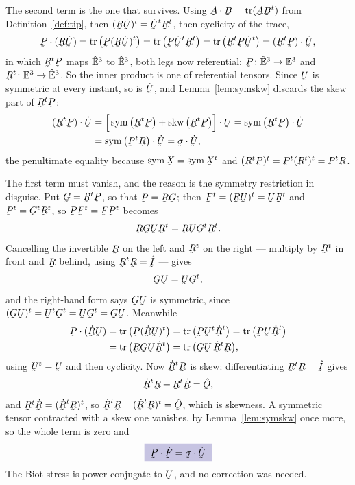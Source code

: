 \begin{solution}
The second term is the one that survives. Using
$\bA\cdot\bB=\tr(\bA\bB^{t})$ from Definition~\ref{def:tip}, then
$(\bR\dot\bU)^{t}=\dot\bU^{t}\bR^{t}$, then cyclicity of the trace,
\[
   \bP\cdot(\bR\dot\bU)=\tr\big(\bP(\bR\dot\bU)^{t}\big)
   =\tr\big(\bP\dot\bU^{t}\bR^{t}\big)
   =\tr\big(\bR^{t}\bP\dot\bU^{t}\big)
   =(\bR^{t}\bP)\cdot\dot\bU ,
\]
in which $\bR^{t}\bP$ maps $\hat{\mathbb{E}}^{3}$ to $\hat{\mathbb{E}}^{3}$, both legs now referential:
$\bP\colon\hVt\to\Vt$ and $\bR^{t}\colon\Vt\to\hVt$. So the inner
product is one of referential tensors. Since $\bU$ is symmetric at
every instant, so is $\dot\bU$, and Lemma~\ref{lem:symskw} discards the
skew part of $\bR^{t}\bP$:
\[
\begin{aligned}
   (\bR^{t}\bP)\cdot\dot\bU
   &=\Big[\Sym\big(\bR^{t}\bP\big)+\Skw\big(\bR^{t}\bP\big)\Big]
     \cdot\dot\bU
    =\Sym\big(\bR^{t}\bP\big)\cdot\dot\bU\\
   &=\Sym\big(\bP^{t}\bR\big)\cdot\dot\bU
    =\vek\sigma\cdot\dot\bU ,
\end{aligned}
\]
the penultimate equality because $\Sym\bX=\Sym\bX^{t}$ and
$(\bR^{t}\bP)^{t}=\bP^{t}(\bR^{t})^{t}=\bP^{t}\bR$.

The first term must vanish, and the reason is the symmetry restriction
 in disguise. Put $\bG=\bR^{t}\bP$, so that $\bP=\bR\bG$;
then $\bF^{t}=(\bR\bU)^{t}=\bU\bR^{t}$ and $\bP^{t}=\bG^{t}\bR^{t}$,
so $\bP\bF^{t}=\bF\bP^{t}$ becomes
\[
   \bR\bG\bU\bR^{t}=\bR\bU\bG^{t}\bR^{t} .
\]
Cancelling the invertible $\bR$ on the left and $\bR^{t}$ on the right
--- multiply by $\bR^{t}$ in front and $\bR$ behind, using
$\bR^{t}\bR=\hI$ --- gives
\[
   \bG\bU=\bU\bG^{t} ,
\]
and the right-hand form says $\bG\bU$ is symmetric, since
$(\bG\bU)^{t}=\bU^{t}\bG^{t}=\bU\bG^{t}=\bG\bU$. Meanwhile
\[
\begin{aligned}
   \bP\cdot(\dot\bR\bU)
   &=\tr\big(\bP(\dot\bR\bU)^{t}\big)
    =\tr\big(\bP\bU^{t}\dot\bR^{t}\big)
    =\tr\big(\bP\bU\dot\bR^{t}\big)\\
   &=\tr\big(\bR\bG\bU\dot\bR^{t}\big)
    =\tr\big(\bG\bU\,\dot\bR^{t}\bR\big),
\end{aligned}
\]
using $\bU^{t}=\bU$ and then cyclicity. Now $\dot\bR^{t}\bR$ is skew:
differentiating $\bR^{t}\bR=\hI$ gives
\[
   \dot\bR^{t}\bR+\bR^{t}\dot\bR=\hOb ,
\]
and $\bR^{t}\dot\bR=(\dot\bR^{t}\bR)^{t}$, so
$\dot\bR^{t}\bR+(\dot\bR^{t}\bR)^{t}=\hOb$, which is skewness. A
symmetric tensor contracted with a skew one vanishes, by
Lemma~\ref{lem:symskw} once more, so the whole term is zero and
\[
   \boxed{\;\bP\cdot\dot\bF=\vek\sigma\cdot\dot\bU\;}
\]
The Biot stress is power conjugate to $\bU$, and no correction was
needed.


\end{solution}
